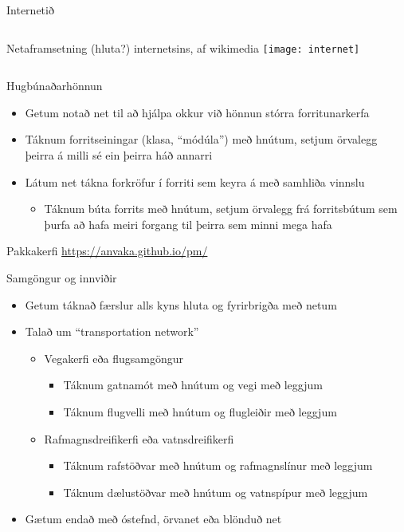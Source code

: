 \documentclass[handout]{beamer}
\begin{document}
\begin{frame}{Internetið}
\begin{columns}
Netaframsetning (hluta?) internetsins, af wikimedia
\texttt{[image: internet]}
\end{columns}
\end{frame}


\begin{frame}{Hugbúnaðarhönnun}
\begin{itemize}
 \item Getum notað net til að hjálpa okkur við hönnun stórra forritunarkerfa
 \item Táknum forritseiningar (klasa, ``módúla'') með hnútum, setjum örvalegg þeirra á milli sé ein þeirra háð annarri
 \item Látum net tákna forkröfur í forriti sem keyra á með samhliða vinnslu
 \begin{itemize}
  \item Táknum búta forrits með hnútum, setjum örvalegg frá forritsbútum sem þurfa að hafa meiri forgang til þeirra sem minni mega hafa
 \end{itemize}
\end{itemize}
\end{frame}

\begin{frame}{Pakkakerfi}
\url{https://anvaka.github.io/pm/}
\end{frame}

\begin{frame}{Samgöngur og innviðir}
\begin{itemize}
 \item Getum táknað færslur alls kyns hluta og fyrirbrigða með netum
 \item Talað um ``transportation network''
 \begin{itemize}
  \item Vegakerfi eða flugsamgöngur
  \begin{itemize}
   \item Táknum gatnamót með hnútum og vegi með leggjum 
   \item Táknum flugvelli með hnútum og flugleiðir með leggjum
  \end{itemize}
  \item Rafmagnsdreifikerfi eða vatnsdreifikerfi
  \begin{itemize}
   \item Táknum rafstöðvar með hnútum og rafmagnslínur með leggjum
   \item Táknum dælustöðvar með hnútum og vatnspípur með leggjum
  \end{itemize}
 \end{itemize}
 \item Gætum endað með óstefnd, örvanet eða blönduð net
\end{itemize}
\end{frame}
\end{document}

